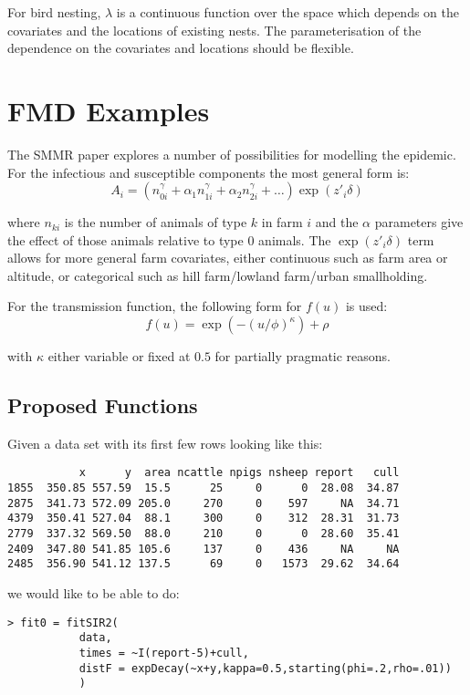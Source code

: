 \documentclass{article}
\begin{document}
For bird nesting, $\lambda$ is a continuous function over the space which depends on the 
covariates and the locations of existing nests. The parameterisation of the dependence 
on the covariates and locations should be flexible.


\section*{FMD Examples}

The SMMR paper explores a number of possibilities for modelling the epidemic. For the infectious
and susceptible components the most general form is:
$$
A_i = (n_{0i}^\gamma + \alpha_1 n_{1i}^\gamma + \alpha_2 n_{2i}^\gamma + \dots) \exp(z'_i\delta)
$$

where $n_{ki}$ is the number of animals of type $k$ in farm $i$ and
the $\alpha$ parameters give the effect of those animals relative to
type $0$ animals. The $\exp(z'_i\delta)$ term allows for more general
farm covariates, either continuous such as farm area or altitude, or
categorical such as hill farm/lowland farm/urban smallholding.

For the transmission function, the following form for $f(u)$ is used:
$$
f(u) =  \exp(-(u/\phi)^\kappa) + \rho
$$

with $\kappa$ either variable or fixed at $0.5$ for partially pragmatic reasons.


\subsection*{Proposed Functions}

Given a data set with its first few rows looking like this:

\begin{verbatim}
           x      y  area ncattle npigs nsheep report   cull 
1855  350.85 557.59  15.5      25     0      0  28.08  34.87
2875  341.73 572.09 205.0     270     0    597     NA  34.71
4379  350.41 527.04  88.1     300     0    312  28.31  31.73 
2779  337.32 569.50  88.0     210     0      0  28.60  35.41 
2409  347.80 541.85 105.6     137     0    436     NA     NA
2485  356.90 541.12 137.5      69     0   1573  29.62  34.64 
\end{verbatim}

 we would like to be able to do:

\begin{verbatim}
> fit0 = fitSIR2(
           data, 
           times = ~I(report-5)+cull,
           distF = expDecay(~x+y,kappa=0.5,starting(phi=.2,rho=.01))
           )
\end{verbatim}
\end{document}
